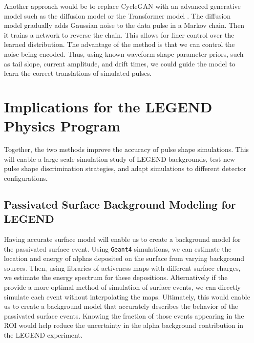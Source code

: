 Another approach would be to replace CycleGAN with an advanced generative model such as the diffusion model \cite{2020arXiv200611239H} or the Transformer model \cite{Transformer}. The diffusion model gradually adds Gaussian noise to the data pulse in a Markov chain. Then it trains a network to reverse the chain. This allows for finer control over the learned distribution. The advantage of the method is that we can control the noise being encoded. Thus, using known waveform shape parameter priors, such as tail slope, current amplitude, and drift times, we could guide the model to learn the correct translations of simulated pulses.

\section{Implications for the LEGEND Physics Program}

Together, the two methods improve the accuracy of pulse shape simulations. This will enable a large-scale simulation study of LEGEND backgrounds, test new pulse shape discrimination strategies, and adapt simulations to different detector configurations.  

\subsection{Passivated Surface Background Modeling for LEGEND}
Having accurate surface model will enable us to create a background model for the passivated surface event. Using \texttt{Geant4} simulations, we can estimate the location and energy of alphas deposited on the surface from varying background sources. Then, using libraries of {\ehd} activeness maps with different surface charges, we estimate the energy spectrum for these depositions. Alternatively if the {\ssd} provide a more optimal method of simulation of surface events, we can directly simulate each event without interpolating the maps. Ultimately, this would enable us to create a background model that accurately describes the behavior of the passivated surface events. Knowing the fraction of those events appearing in the {\onbb} ROI would help reduce the uncertainty in the alpha background contribution in the LEGEND experiment.

